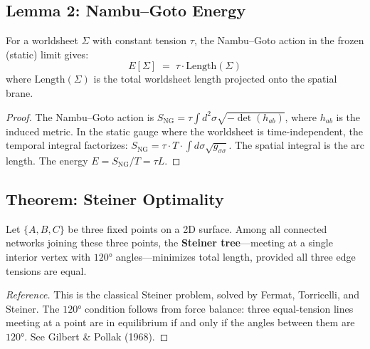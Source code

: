 \subsection{Lemma 2: Nambu--Goto Energy}

\begin{derivationbox}[title=Lemma 2: Nambu--Goto Energy for Frozen Configurations]
    For a worldsheet $\Sigma$ with constant tension $\tau$, the Nambu--Goto action
    in the frozen (static) limit gives:
    \begin{equation}
        \label{eq:nambu_goto_energy}
        E[\Sigma] \;=\; \tau \cdot \mathrm{Length}(\Sigma)
    \end{equation}
    where $\mathrm{Length}(\Sigma)$ is the total worldsheet length projected onto
    the spatial brane. \tagDer
\end{derivationbox}

\begin{proof}
The Nambu--Goto action is $S_{\mathrm{NG}} = \tau \int d^2\sigma \sqrt{-\det(h_{ab})}$,
where $h_{ab}$ is the induced metric. In the static gauge where the worldsheet is
time-independent, the temporal integral factorizes:
$S_{\mathrm{NG}} = \tau \cdot T \cdot \int d\sigma \sqrt{g_{\sigma\sigma}}$.
The spatial integral is the arc length. The energy $E = S_{\mathrm{NG}}/T = \tau L$.
\end{proof}

\subsection{Theorem: Steiner Optimality}

\begin{resultbox}[title=Theorem: Steiner Optimality for Y-Junctions]
    Let $\{A, B, C\}$ be three fixed points on a 2D surface. Among all connected
    networks joining these three points, the \textbf{Steiner tree}---meeting at a
    single interior vertex with $120°$ angles---minimizes total length, provided
    all three edge tensions are equal. \tagM
\end{resultbox}

\begin{proof}[Reference]
This is the classical Steiner problem, solved by Fermat, Torricelli, and Steiner.
The $120°$ condition follows from force balance: three equal-tension lines meeting
at a point are in equilibrium if and only if the angles between them are $120°$.
See Gilbert \& Pollak (1968).
\end{proof}

